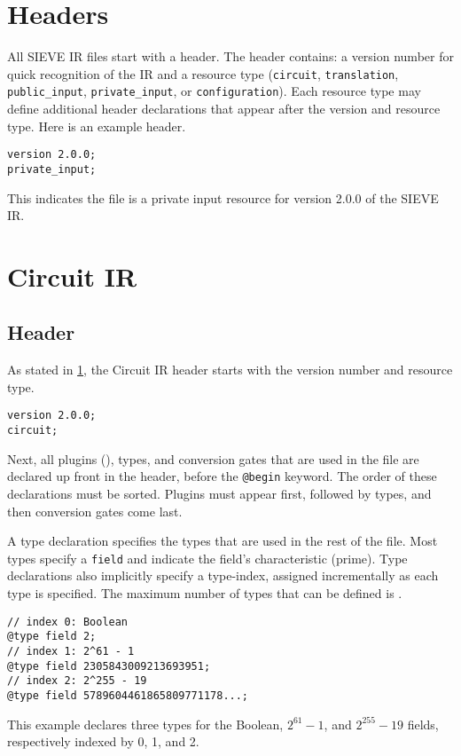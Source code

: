 \section{Headers}
\label{sec:headers}

All SIEVE IR files start with a header.
The header contains:
a version number for quick recognition of the IR
and
a resource type (\texttt{circuit}, \texttt{translation}, \texttt{public\_input}, \texttt{private\_input}, or \texttt{configuration}).
Each resource type may define additional header declarations that appear after the version and resource type.
% 
Here is an example header.
\begin{lstlisting}[language=ir]
version 2.0.0;
private_input;
\end{lstlisting}
This indicates the file is a private input resource for version 2.0.0 of the SIEVE IR. 

\section{Circuit IR}
\label{sec:circuitir}

\subsection{Header}
\label{subsec:headers}

As stated in \cref{sec:headers}, the Circuit IR header starts with the version number and resource type.
\begin{lstlisting}[language=ir]
version 2.0.0;
circuit;
\end{lstlisting}
Next, all plugins (), types, and conversion gates that are used in the file are declared up front in the header, before 
the \texttt{@begin} keyword.
The order of these declarations must be sorted.
Plugins must appear first, followed by types, and then conversion gates come last.

A type declaration specifies the types that are used in the rest of the file.
Most types specify a \texttt{field} and indicate the field's characteristic (prime).
Type declarations also implicitly specify a type-index, assigned incrementally as each type is specified. The maximum number of types that can be defined is \maxfieldcount. 
%
\begin{lstlisting}[language=ir]
// index 0: Boolean
@type field 2;
// index 1: 2^61 - 1
@type field 2305843009213693951;
// index 2: 2^255 - 19
@type field 5789604461865809771178...;
\end{lstlisting}
%
This example declares three types for the Boolean, $2^{61}-1$, and $2^{255}-19$ fields, respectively indexed by 0, 1, and 2.

